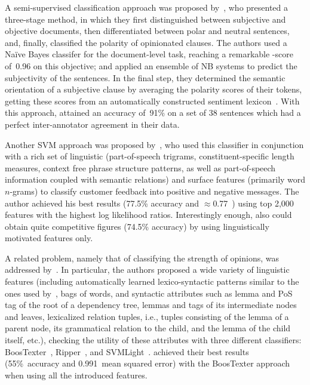 
A semi-supervised classification approach was proposed
by~\citet{Yu:03}, who presented a three-stage method, in which they
first distinguished between subjective and objective documents, then
differentiated between polar and neutral sentences, and, finally,
classified the polarity of opinionated clauses.  The authors used a
Na{\"i}ve Bayes classifer for the document-level task, reaching a
remarkable \F-score of~0.96 on this objective; and applied an ensemble
of NB systems to predict the subjectivity of the sentences.  In the
final step, they determined the semantic orientation of a subjective
clause by averaging the polarity scores of their tokens, getting these
scores from an automatically constructed sentiment
lexicon~\cite{Hatzivassi:97}.  With this approach, \citeauthor{Yu:03}
attained an accuracy of~91\% on a set of 38 sentences which had a
perfect inter-annotator agreement in their data.


Another SVM approach was proposed by~\citet{Gamon:04}, who used this
classifier in conjunction with a rich set of linguistic
(part-of-speech trigrams, constituent-specific length measures,
context free phrase structure patterns, as well as part-of-speech
information coupled with semantic relations) and surface features
(primarily word $n$-grams) to classify customer feedback into positive
and negative messages.  The author achieved his best results (77.5\%
accuracy and $\approx$0.77~\F) using top 2,000 features with the
highest log likelihood ratios.  Interestingly enough,
\citeauthor{Gamon:04} also could obtain quite competitive figures
(74.5\% accuracy) by using linguistically motivated features only.


A related problem, namely that of classifying the strength of
opinions, was addressed by~\citet{Wilson:04}.  In particular, the
authors proposed a wide variety of linguistic features (including
automatically learned lexico-syntactic patterns similar to the ones
used by~\citet{Riloff:03}, bags of words, and syntactic attributes
such as lemma and PoS tag of the root of a dependency tree, lemmas and
tags of its intermediate nodes and leaves, lexicalized relation
tuples, i.e., tuples consisting of the lemma of a parent node, its
grammatical relation to the child, and the lemma of the child itself,
etc.), checking the utility of these attributes with three different
classifiers: BoosTexter~\cite{Schapire:00}, Ripper~\cite{Cohen:95},
and SVMLight~\cite{Joachims:99}.  \citet{Wilson:04} achieved their
best results (55\%~accuracy and 0.991~mean squared error) with the
BoosTexter approach when using all the introduced features.

